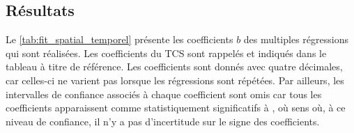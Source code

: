 \documentclass[../main.tex]{subfiles}
\begin{document}
\subsection{Résultats}

Le \cref{tab:fit_spatial_temporel} présente les coefficients $b$ des multiples régressions qui sont réalisées. Les coefficients du TCS sont rappelés et indiqués
dans le tableau à titre de référence. Les coefficients sont donnés avec quatre décimales, car celles-ci ne varient pas lorsque les régressions sont répétées.
Par ailleurs, les intervalles de confiance associés à chaque coefficient sont omis car tous les coefficients apparaissent comme statistiquement significatifs à
, où sens où, à ce niveau de confiance, il n'y a pas d'incertitude sur le signe des coefficients.

\begin{table}[htpb]
    \centering
    \caption{Estimation des coefficients des régressions de Poisson établies entre les quatre variables de grande échelle du TCS, issues d'ERA5, et l'activité
    observée issue d'IBTrACS entre 1980 et 2019. La colonne  correspond à la valeur $N_{\mathrm{temps}}$.}
    \label{tab:fit_spatial_temporel}

\end{table}
\end{document}

